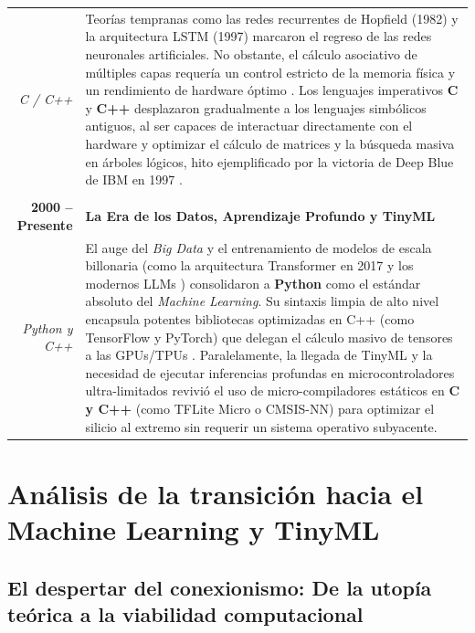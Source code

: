 \documentclass[12pt, a4paper]{article}
\begin{document}
\begin{longtable}{r | p{}}
\textit{C / C++} & Teorías tempranas como las redes recurrentes de Hopfield (1982) \parencite{zhang2023turing} y la arquitectura LSTM (1997) \parencite{zhang2023turing} marcaron el regreso de las redes neuronales artificiales. No obstante, el cálculo asociativo de múltiples capas requería un control estricto de la memoria física y un rendimiento de hardware óptimo \parencite{haenlein2019brief}. Los lenguajes imperativos \textbf{C} y \textbf{C++} desplazaron gradualmente a los lenguajes simbólicos antiguos, al ser capaces de interactuar directamente con el hardware y optimizar el cálculo de matrices y la búsqueda masiva en árboles lógicos, hito ejemplificado por la victoria de Deep Blue de IBM en 1997 \parencite{haenlein2019brief, buchanan2005very}. \\
& \\
\textbf{2000 -- Presente} & \textbf{La Era de los Datos, Aprendizaje Profundo y TinyML} \\
\textit{Python y C++} & El auge del \textit{Big Data} y el entrenamiento de modelos de escala billonaria (como la arquitectura Transformer en 2017 \parencite{zhang2023turing} y los modernos LLMs \parencite{zhang2023turing}) consolidaron a \textbf{Python} como el estándar absoluto del \textit{Machine Learning}. Su sintaxis limpia de alto nivel encapsula potentes bibliotecas optimizadas en C++ (como TensorFlow y PyTorch) que delegan el cálculo masivo de tensores a las GPUs/TPUs \parencite{zhang2023turing}. Paralelamente, la llegada de TinyML y la necesidad de ejecutar inferencias profundas en microcontroladores ultra-limitados revivió el uso de micro-compiladores estáticos en \textbf{C y C++} (como TFLite Micro o CMSIS-NN) para optimizar el silicio al extremo sin requerir un sistema operativo subyacente. \\
\end{longtable}
\vspace{0.4cm}

\section{Análisis de la transición hacia el Machine Learning y TinyML}

\subsection{El despertar del conexionismo: De la utopía teórica a la viabilidad computacional}
\end{document}
